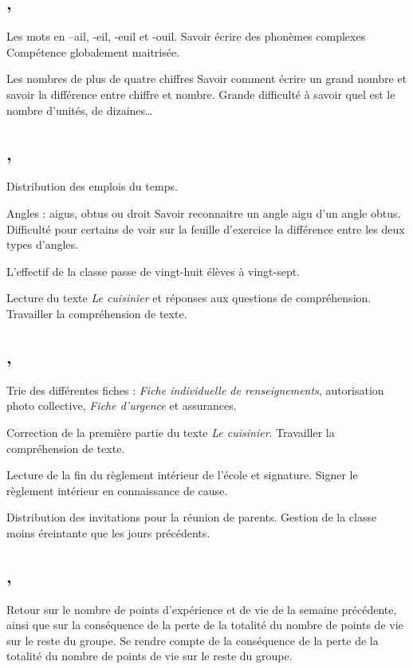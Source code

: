 \documentclass{article}
\begin{document}
\subsection{ \sep}
\ort\ham Les mots en –ail, -eil, -euil et -ouil.
\obj Savoir écrire des phonèmes complexes
\bil Compétence globalement maitrisée.

\nec\hpm Les nombres de plus de quatre chiffres
\obj Savoir comment écrire un grand nombre et savoir la différence entre chiffre et nombre.
\bil Grande difficulté à savoir quel est le nombre d’unités, de dizaines\dots


\subsection{ \sep}
\gdc Distribution des emplois du temps.

\eeg\ham Angles : aigus, obtus ou droit
\obj Savoir reconnaitre un angle aigu d’un angle obtus.
\bil Difficulté pour certains de voir sur la feuille d’exercice la différence entre les deux types d’angles.

\adm{} L’effectif de la classe passe de vingt-huit élèves à vingt-sept.

\lec\hpm Lecture du texte \emph{Le cuisinier} et réponses aux questions de compréhension.
\obj Travailler la compréhension de texte.


\subsection{ \sep}
\adm\ham Trie  des différentes fiches : \textit{Fiche individuelle de renseignements}, autorisation photo collective, \textit{Fiche d’urgence} et assurances.

\lec\amr Correction de la première partie du texte \emph{Le cuisinier}.
\obj Travailler la compréhension de texte.

\emc\hpm Lecture de la fin du règlement intérieur de l’école et signature.
\obj Signer le règlement intérieur en connaissance de cause.

\adm{} Distribution des invitations pour la réunion de parents.
\bil Gestion de la classe moins éreintante que les jours précédents. 

\subsection{ \sep}
\clc\ham Retour sur le nombre de points d’expérience et de vie de la semaine précédente, ainsi que sur la conséquence de la perte de la totalité du nombre de points de vie sur le reste du groupe.
\obj Se rendre compte de la conséquence de la perte de la totalité du nombre de points de vie sur le reste du groupe.
\end{document}
